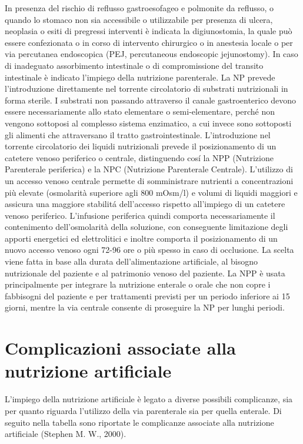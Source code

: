 \documentclass[12pt,a4paper,oneside]{book}
\begin{document}
In presenza del rischio di reflusso gastroesofageo e polmonite da reflusso, o quando lo stomaco non sia accessibile o utilizzabile per presenza di ulcera, neoplasia o esiti di pregressi interventi \`e indicata la digiunostomia, la quale pu\`o essere confezionata o in corso di intervento chirurgico o in anestesia locale o per via percutanea endoscopica (PEJ, percutaneous endoscopic jejunostomy). 
In caso di inadeguato assorbimento intestinale o di compromissione del transito intestinale \`e indicato l'impiego della nutrizione parenterale. La NP prevede l'introduzione direttamente nel torrente circolatorio di substrati nutrizionali in forma sterile. I substrati non passando attraverso il canale gastroenterico devono essere necessariamente allo stato elementare o semi-elementare, perché non vengono sottoposi al complesso sistema enzimatico, a cui invece sono sottoposti gli alimenti che attraversano il tratto gastrointestinale. L'introduzione nel torrente circolatorio dei liquidi nutrizionali prevede il posizionamento di un catetere venoso periferico o centrale, distinguendo cos\'i la NPP (Nutrizione Parenterale periferica) e la NPC (Nutrizione Parenterale Centrale).
L'utilizzo di un accesso venoso centrale permette di somministrare nutrienti a concentrazioni pi\`u elevate (osmolarit\`a superiore agli 800 mOsm/l) e volumi di liquidi maggiori e assicura una maggiore stabilit\'a dell'accesso rispetto all'impiego di un catetere venoso periferico. L'infusione periferica quindi comporta necessariamente il contenimento dell'osmolarit\`a della soluzione, con conseguente limitazione degli apporti energetici ed elettrolitici e inoltre comporta il posizionamento di un nuovo accesso venoso ogni 72-96 ore o pi\`u spesso in caso di occlusione. 
La scelta viene fatta in base alla durata dell'alimentazione artificiale, al bisogno nutrizionale del paziente e al patrimonio venoso del paziente. La NPP \`e usata principalmente per integrare la nutrizione enterale o orale che non copre i fabbisogni del paziente e per trattamenti previsti per un periodo inferiore ai 15 giorni, mentre la via centrale consente di proseguire la NP per lunghi periodi. 


\section{Complicazioni associate alla nutrizione artificiale}

L'impiego della nutrizione artificiale \`e legato a diverse possibili complicanze, sia per quanto riguarda l'utilizzo della via parenterale sia per quella enterale. 
Di seguito nella tabella sono riportate le complicanze associate alla nutrizione artificiale (Stephen M. W., 2000).
\end{document}
